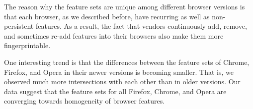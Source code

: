 The reason why the feature sets are unique among different browser
versions is that each browser, as we described before, have recurring
as well as non-persistent features. As a result, the fact that vendors
continuously add, remove, and sometimes re-add features into their
browsers also make them more fingerprintable.


One interesting trend is that the differences between the feature sets
of Chrome, Firefox, and Opera in their newer versions is becoming smaller.
That is, we observed much more intersections with each other than in
older versions. Our data suggest that the feature sets for all
Firefox, Chrome, and Opera are converging towards homogeneity of browser
features.
